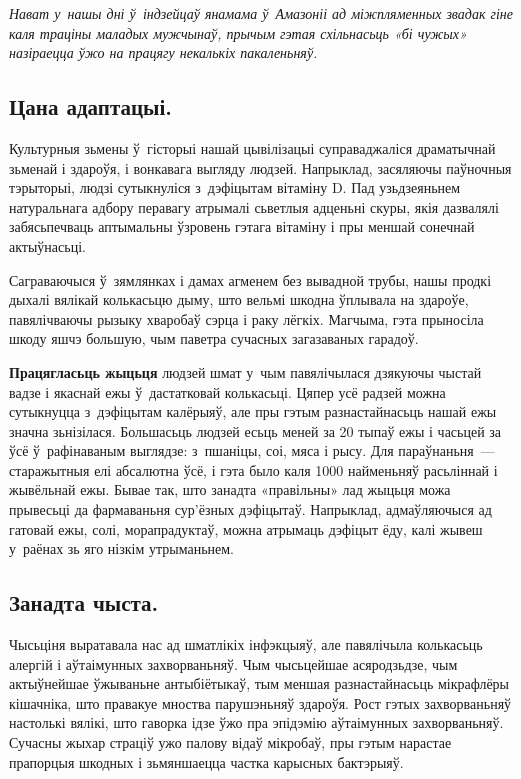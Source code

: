 \emph{Нават у~нашы дні ў~індзейцаў янамама ў~Амазоніі ад міжпляменных звадак гіне каля траціны маладых мужчынаў, прычым гэтая схільнасьць «бі чужых» назіраецца ўжо на працягу некалькіх пакаленьняў.}

\subsection*{Цана адаптацыі.}

Культурныя зьмены ў~гісторыі нашай цывілізацыі суправаджаліся драматычнай зьменай і здароўя, і вонкавага выгляду людзей. Напрыклад, засяляючы паўночныя тэрыторыі, людзі сутыкнуліся з~дэфіцытам вітаміну D. Пад узьдзеяньнем натуральнага адбору перавагу атрымалі сьветлыя адценьні скуры, якія дазвалялі забясьпечваць аптымальны ўзровень гэтага вітаміну і пры меншай сонечнай актыўнасьці. 

Саграваючыся ў~зямлянках і дамах агменем без вывадной трубы, нашы продкі дыхалі вялікай колькасьцю дыму, што вельмі шкодна ўплывала на здароўе, павялічваючы рызыку хваробаў сэрца і раку лёгкіх. Магчыма, гэта прыносіла шкоду яшчэ большую, чым паветра сучасных загазаваных гарадоў.

\textbf{Працягласьць жыцьця} людзей шмат у~чым павялічылася дзякуючы чыстай вадзе і якаснай ежы ў~дастатковай колькасьці. Цяпер усё радзей можна сутыкнуцца з~дэфіцытам калёрыяў, але пры гэтым разнастайнасьць нашай ежы значна зьнізілася. Большасьць людзей есьць меней за 20 тыпаў ежы і часьцей за ўсё ў~рафінаваным выглядзе: з~пшаніцы, соі, мяса і рысу. Для параўнаньня~--- старажытныя елі абсалютна ўсё, і гэта было каля 1000 найменьняў расьліннай і жывёльнай ежы. Бывае так, што занадта «правільны» лад жыцьця можа прывесьці да фармаваньня сур'ёзных дэфіцытаў. Напрыклад, адмаўляючыся ад гатовай ежы, солі, морапрадуктаў, можна атрымаць дэфіцыт ёду, калі жывеш у~раёнах зь яго нізкім утрыманьнем.

\subsection*{Занадта чыста.} 

Чысьціня выратавала нас ад шматлікіх інфэкцыяў, але павялічыла колькасьць алергій і аўтаімунных захворваньняў. Чым чысьцейшае асяродзьдзе, чым актыўнейшае ўжываньне антыбіётыкаў, тым меншая разнастайнасьць мікрафлёры кішачніка, што правакуе мноства парушэньняў здароўя. Рост гэтых захворваньняў настолькі вялікі, што гаворка ідзе ўжо пра эпідэмію аўтаімунных захворваньняў. Сучасны жыхар страціў ужо палову відаў мікробаў, пры гэтым нарастае прапорцыя шкодных і зьмяншаецца частка карысных бактэрыяў.

